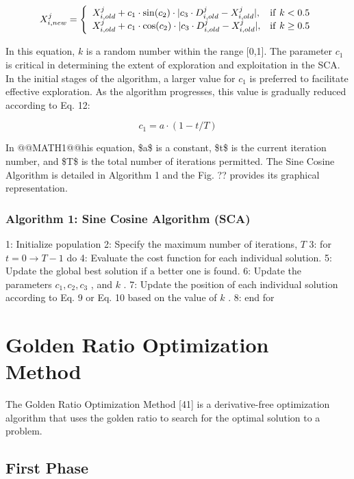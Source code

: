\begin{equation}
X_{i,n e w}^{j}=\left\{\begin{array}{l l}{X_{i,o l d}^{j}+c_{1}\cdot\sin(c_{2})\cdot|c_{3}\cdot D_{i,o l d}^{j}-X_{i,o l d}^{j}|,}&{\mathrm{if~}k<0.5}\\ {X_{i,o l d}^{j}+c_{1}\cdot\cos(c_{2})\cdot|c_{3}\cdot D_{i,o l d}^{j}-X_{i,o l d}^{j}|,}&{\mathrm{if~}k\geq0.5}\end{array}\right.
\end{equation}

In this equation, $k$ is a random number within the range [0,1]. The parameter $c_{1}$ is critical in determining the extent of exploration and exploitation in the SCA. In the initial stages of the algorithm, a larger value for $c_{1}$ is preferred to facilitate effective exploration. As the algorithm progresses, this value is gradually reduced according to Eq. 12:

\begin{equation}
c_{1}=a\cdot(1-t/T)
\end{equation}

In @@MATH1@@his equation, \$a\$ is a constant, \$t\$ is the current iteration number, and \$T\$ is the total number of iterations permitted.
The Sine Cosine Algorithm is detailed in Algorithm 1 and the Fig. ?? provides its graphical representation.

\subsubsection{Algorithm 1: Sine Cosine Algorithm (SCA)}

1: Initialize population
2: Specify the maximum number of iterations, $T$
3: for $t=0\rightarrow T-1$ do
4: Evaluate the cost function for each individual solution.
5: Update the global best solution if a better one is found.
6: Update the parameters $c_{1},c_{2},c_{3}$ , and $k$ .
7: Update the position of each individual solution according to Eq. 9 or Eq. 10 based on the value of $k$ .
8: end for

\section{Golden Ratio Optimization Method}

The Golden Ratio Optimization Method [41] is a derivative-free optimization algorithm that uses the golden ratio to search for the optimal solution to a problem.

\subsection{First Phase}

